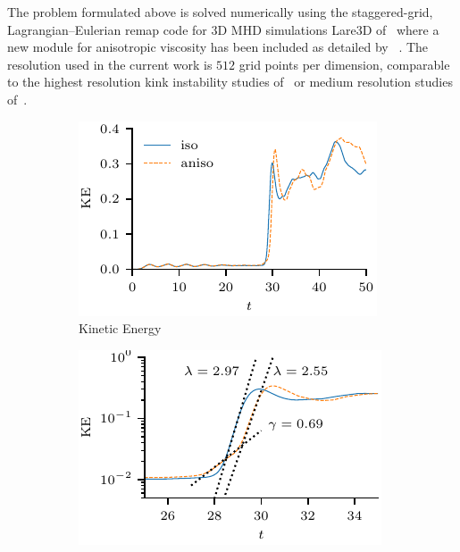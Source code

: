 \documentclass[fleqn,usenatbib]{mnras}
\newcommand{\revcite}[1]{{\color{red} \underline{#1}}}
\begin{document}
The problem formulated above is solved numerically using the staggered-grid,
Lagrangian–Eulerian remap code for 3D MHD simulations Lare3D
of~\cite{arberStaggeredGridLagrangian2001} where a  new module for anisotropic
viscosity has been included as detailed
by~\revcite{\citet{quinnKelvinHelmholtzInstabilityCollapse2021}}. The resolution used in
the current work is  $512$ grid points per dimension, comparable to the highest
resolution kink instability studies of~\cite{hoodCoronalHeatingMagnetic2009} or
medium resolution studies of~\cite{barefordShockHeatingNumerical2015}. 

\begin{figure}
  \centering
    \begin{subfigure}{0.32\textwidth}
      \includegraphics[width=\linewidth]{kinetic_energy-4.pdf}
      \caption{Kinetic Energy}
      \label{fig:kink_ke-4}
    \end{subfigure}
    \hfill
    \begin{subfigure}{0.32\textwidth}
      \includegraphics[width=\linewidth]{kinetic_energy_log-4.pdf}

\end{subfigure}
\end{figure}
\end{document}
